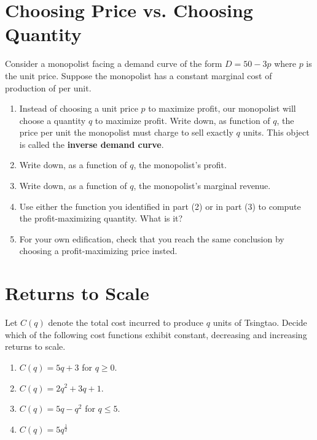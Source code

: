 \documentclass{article}
\begin{document}
\section*{Choosing Price vs. Choosing Quantity}
Consider a monopolist facing a demand curve of the form $D = 50 - 3p$ where $p$ is the unit price. Suppose the monopolist has a constant marginal cost of production of  per unit.

\begin{enumerate}
\item Instead of choosing a unit price $p$ to maximize profit, our monopolist will choose a quantity $q$ to maximize profit. Write down, as function of $q$, the price per unit the monopolist must charge to sell exactly $q$ units. This object is called the \textbf{inverse demand curve}.
\item Write down, as a function of $q$, the monopolist's profit.
\item Write down, as a function of $q$, the monopolist's marginal revenue.
\item Use either the function you identified in part (2) or in part (3) to compute the profit-maximizing quantity. What is it?
\item For your own edification, check that you reach the same conclusion by choosing a profit-maximizing price insted.
\end{enumerate}

\section*{Returns to Scale}

Let $C(q)$ denote the total cost incurred to produce $q$ units of Tsingtao. Decide which of the following cost functions exhibit constant, decreasing and increasing returns to scale.

\begin{enumerate}
\item $C(q) = 5q + 3$ for $q \geq 0$.
\item $C(q) = 2q^2 + 3q + 1$.
\item $C(q) = 5q - q^2$ for $q \leq 5$.
\item $C(q) = 5 q^\frac12$
\end{enumerate}
\end{document}
